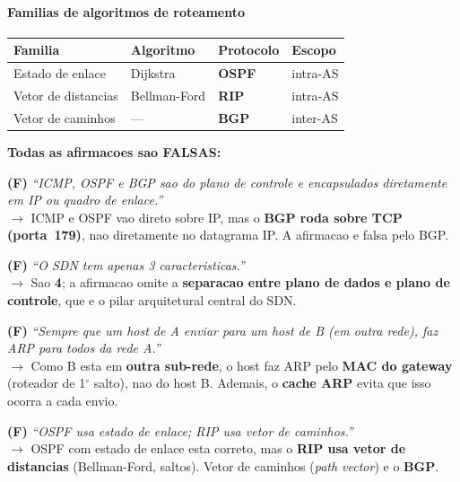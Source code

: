 \documentclass[11pt,a4paper]{article}
\begin{document}
\begin{explicacao}
\paragraph{Familias de algoritmos de roteamento}
\begin{center}
\begin{tabular}{llll}
\toprule
\textbf{Familia} & \textbf{Algoritmo} & \textbf{Protocolo} & \textbf{Escopo} \\
\midrule
Estado de enlace    & Dijkstra     & \textbf{OSPF} & intra-AS \\
Vetor de distancias & Bellman-Ford & \textbf{RIP}  & intra-AS \\
Vetor de caminhos   & ---          & \textbf{BGP}  & inter-AS \\
\bottomrule
\end{tabular}
\end{center}
\end{explicacao}

\begin{resposta}
\textbf{Todas as afirmacoes sao FALSAS:}

\medskip
\textbf{(F)} \textit{``ICMP, OSPF e BGP sao do plano de controle e encapsulados diretamente em IP ou quadro de enlace.''}\\
$\to$ ICMP e OSPF vao direto sobre IP, mas o \textbf{BGP roda sobre TCP (porta~179)}, nao diretamente no datagrama IP. A afirmacao e falsa pelo BGP.

\medskip
\textbf{(F)} \textit{``O SDN tem apenas 3 caracteristicas.''}\\
$\to$ Sao \textbf{4}; a afirmacao omite a \textbf{separacao entre plano de dados e plano de controle}, que e o pilar arquitetural central do SDN.

\medskip
\textbf{(F)} \textit{``Sempre que um host de A enviar para um host de B (em outra rede), faz ARP para todos da rede A.''}\\
$\to$ Como B esta em \textbf{outra sub-rede}, o host faz ARP pelo \textbf{MAC do gateway} (roteador de 1$^{\circ}$ salto), nao do host B. Ademais, o \textbf{cache ARP} evita que isso ocorra a cada envio.

\medskip
\textbf{(F)} \textit{``OSPF usa estado de enlace; RIP usa vetor de caminhos.''}\\
$\to$ OSPF com estado de enlace esta correto, mas o \textbf{RIP usa vetor de distancias} (Bellman-Ford, saltos). Vetor de caminhos (\textit{path vector}) e o \textbf{BGP}.
\end{resposta}
\end{document}
